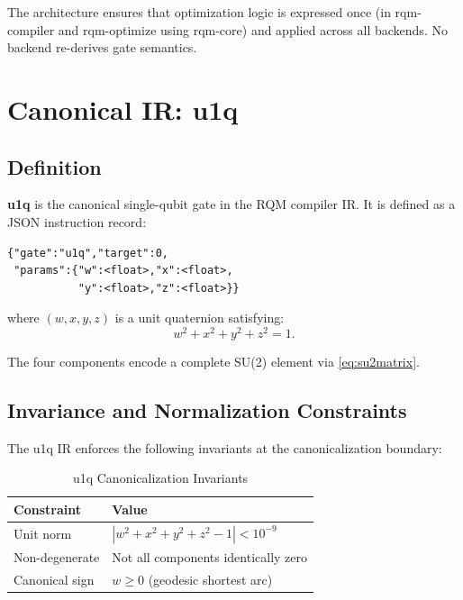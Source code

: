 \documentclass[conference]{IEEEtran}
\begin{document}
The architecture ensures that optimization logic is expressed once (in rqm-compiler and
rqm-optimize using rqm-core) and applied across all backends. No backend re-derives gate
semantics.

\section{Canonical IR: u1q}

\subsection{Definition}

\textbf{u1q} is the canonical single-qubit gate in the RQM compiler IR. It is defined as a
JSON instruction record:

\begin{lstlisting}[language={},label={lst:u1qdef}]
{"gate":"u1q","target":0,
 "params":{"w":<float>,"x":<float>,
           "y":<float>,"z":<float>}}
\end{lstlisting}

where $(w, x, y, z)$ is a unit quaternion satisfying:
\begin{equation}
w^2 + x^2 + y^2 + z^2 = 1.
\label{eq:unitnorm}
\end{equation}

The four components encode a complete SU(2) element via \eqref{eq:su2matrix}.

\subsection{Invariance and Normalization Constraints}

The u1q IR enforces the following invariants at the canonicalization boundary:

\begin{table}[htbp]
\caption{u1q Canonicalization Invariants}
\begin{center}
\begin{tabular}{ll}
\toprule
\textbf{Constraint} & \textbf{Value} \\
\midrule
Unit norm & $|w^2 + x^2 + y^2 + z^2 - 1| < 10^{-9}$ \\
Non-degenerate & Not all components identically zero \\
Canonical sign & $w \geq 0$ (geodesic shortest arc) \\
\bottomrule
\end{tabular}
\label{tab:invariants}
\end{center}
\end{table}
\end{document}

